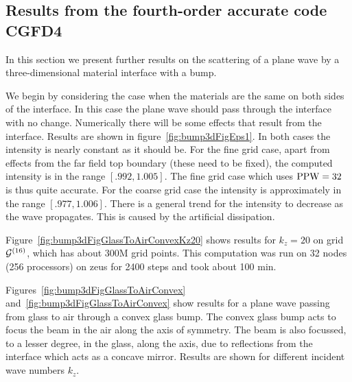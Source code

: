 \newcommand{\upArrow}[2]{%
\psline[linewidth=1.pt]{->}(0,-1)(0,1)
\rput[l](0.1,-1){\smallss #1}
\rput[l](0.1,+1){\smallss #2}
}
\newcommand{\downArrow}[2]{%
\psline[linewidth=1.pt]{<-}(0,-1)(0,1)
\rput[l](0.1,-1){\smallss #2}
\rput[l](0.1,+1){\smallss #1}
}
\clearpage
\subsection{Results from the fourth-order accurate code CGFD4}


In this section we present further results on the scattering of a plane wave
by a three-dimensional material interface with a bump.


We begin by considering the case when the materials are the same on both sides of the interface.
In this case the plane wave should pass through the interface with no change. Numerically there
will be some effects that result from the interface.
Results are shown in figure~\ref{fig:bump3dFigEps1}. In both cases the intensity is nearly
constant as it should be. For the fine grid case, apart from effects from the far field top boundary (these need to be fixed),
the computed intensity is in the range $[.992,1.005]$. The fine grid case which uses ${\rm PPW}=32$ is
thus quite accurate. For the coarse grid case the intensity is approximately in the range $[.977,1.006]$. 
There is a general trend for the intensity to decrease as the wave propagates. This is caused by the artificial dissipation. 



Figure~\ref{fig:bump3dFigGlassToAirConvexKz20} shows results for $k_z=20$ on grid ${\mathcal G}^{(16)}$, which 
has about 300M grid points. This computation was run on 32 nodes (256 processors) on zeus for 2400 steps 
and took about 100 min.


Figures~\ref{fig:bump3dFigGlassToAirConvex} and~\ref{fig:bump3dFigGlassToAirConvex} show results for a
plane wave passing from glass to air through a convex glass bump. 
The convex glass bump acts to focus the beam in the air along the axis of symmetry. The beam is also focussed, to
a lesser degree, in the glass, along the axis, due to reflections from the interface which acts as a concave mirror. 
Results are shown for different incident wave numbers $k_z$.



